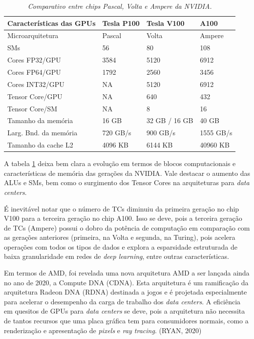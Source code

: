 \documentclass[letterpaper, 10 pt, conference]{ieeeconf}  %
\begin{document}
\begin{table}[h]
\centering
\caption{\textit{Comparativo entre chips Pascal, Volta e Ampere da NVIDIA.}}\label{table:1}
\begin{tabular}{|l|l|l|l|} \hline
Características das GPUs & Tesla P100 & Tesla V100 & A100 \\ \hline
Microarquitetura & Pascal & Volta & Ampere \\ \hline
SMs & 56 & 80 & 108 \\ \hline
Cores FP32/GPU & 3584 & 5120 & 6912 \\ \hline
Cores FP64/GPU & 1792 & 2560 & 3456 \\ \hline
Cores INT32/GPU & NA & 5120 & 6912 \\ \hline
Tensor Core/GPU & NA & 640 & 432 \\ \hline
Tensor Core/SM & NA & 8 & 16 \\ \hline
Tamanho da memória & 16 GB & 32 GB / 16 GB & 40 GB \\\hline
Larg. Bnd. da memória & 720 GB/s & 900 GB/s & 1555 GB/s \\ \hline
Tamanho da cache L2 & 4096 KB & 6144 KB & 40960 KB \\ \hline
\end{tabular}
\end{table}

A tabela \ref{table:1} deixa bem clara a evolução em termos de blocos computacionais e características de memória das gerações da NVIDIA. Vale destacar o aumento das ALUs e SMs, bem como o surgimento dos Tensor Cores na arquiteturas para \textit{data centers}. 

É inevitável notar que o número de TCs diminuiu da primeira geração no chip V100 para a terceira geração no chip A100. Isso se deve, pois a terceira geração de TCs (Ampere) possui o dobro da potência de computação em comparação com as gerações anteriores (primeira, na Volta e segunda, na Turing), pois acelera operações com todos os tipos de dados e explora a esparsidade estruturada de baixa granularidade em redes de \textit{deep learning}, entre outras características.

Em termos de AMD, foi revelada uma nova arquitetura AMD a ser lançada ainda no ano de 2020, a Compute DNA (CDNA). Esta arquitetura é um ramificação da arquitetura Radeon DNA (RDNA) destinada a jogos e é projetada especialmente para acelerar o desempenho da carga de trabalho dos \textit{data centers}. A eficiência em quesitos de GPUs para \textit{data centers} se deve, pois a arquitetura não necessita de tantos recursos que uma placa gráfica tem para consumidores normais, como a renderização e apresentação de \textit{pixels} e \textit{ray tracing}. (RYAN, 2020)
\end{document}
